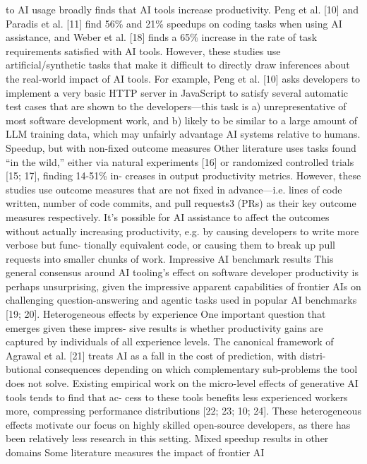 to AI usage broadly finds that AI tools increase productivity. Peng et al. [10] and Paradis et al. [11]
find 56\% and 21\% speedups on coding tasks when using AI assistance, and Weber et al. [18] finds
a 65\% increase in the rate of task requirements satisfied with AI tools. However, these studies use
artificial/synthetic tasks that make it difficult to directly draw inferences about the real-world impact
of AI tools. For example, Peng et al. [10] asks developers to implement a very basic HTTP server
in JavaScript to satisfy several automatic test cases that are shown to the developers—this task is a)
unrepresentative of most software development work, and b) likely to be similar to a large amount
of LLM training data, which may unfairly advantage AI systems relative to humans.
Speedup, but with non-fixed outcome measures
Other literature uses tasks found “in the wild,”
either via natural experiments [16] or randomized controlled trials [15; 17], finding 14-51\% in-
creases in output productivity metrics. However, these studies use outcome measures that are not
fixed in advance—i.e. lines of code written, number of code commits, and pull requests3 (PRs)
as their key outcome measures respectively. It’s possible for AI assistance to affect the outcomes
without actually increasing productivity, e.g. by causing developers to write more verbose but func-
tionally equivalent code, or causing them to break up pull requests into smaller chunks of work.
Impressive AI benchmark results
This general consensus around AI tooling’s effect on software
developer productivity is perhaps unsurprising, given the impressive apparent capabilities of frontier
AIs on challenging question-answering and agentic tasks used in popular AI benchmarks [19; 20].
Heterogeneous effects by experience
One important question that emerges given these impres-
sive results is whether productivity gains are captured by individuals of all experience levels. The
canonical framework of Agrawal et al. [21] treats AI as a fall in the cost of prediction, with distri-
butional consequences depending on which complementary sub-problems the tool does not solve.
Existing empirical work on the micro-level effects of generative AI tools tends to find that ac-
cess to these tools benefits less experienced workers more, compressing performance distributions
[22; 23; 10; 24].
These heterogeneous effects motivate our focus on highly skilled open-source developers, as there
has been relatively less research in this setting.
Mixed speedup results in other domains
Some literature measures the impact of frontier AI

